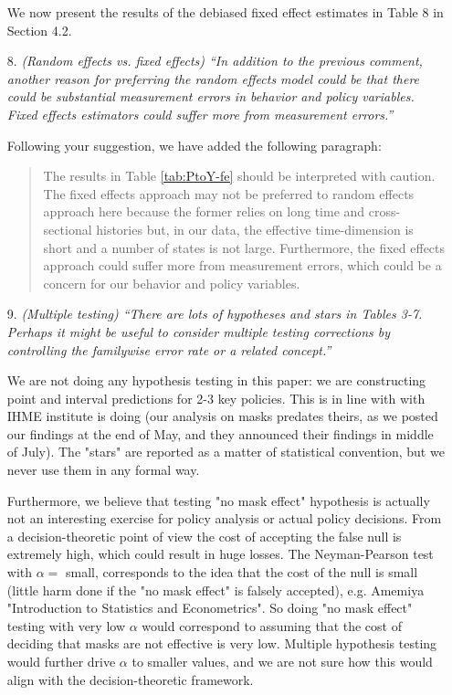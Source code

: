 \documentclass[11pt]{article}
\begin{document}
\begin{itemize}
We now present the results of the debiased fixed effect estimates in Table 8 in Section 4.2. 
  
\item[8.]  \textit{(Random effects vs. fixed effects) ``In addition to the previous comment, another reason for
preferring the random effects model could be that there could be substantial measurement
errors in behavior and policy variables. Fixed effects estimators could suffer more from measurement
errors.''}

Following your suggestion, we have added the following paragraph:
\begin{quote}
The results in Table \ref{tab:PtoY-fe} should be interpreted with caution. The fixed effects approach may not be preferred to random effects approach here because the former relies on long time and cross-sectional histories but, in our data, the effective time-dimension is short and a number of states is not large. Furthermore, the fixed effects approach could suffer more from  measurement errors, which could be a concern for our behavior and policy variables.
\end{quote}
  
\item[9.]  \textit{(Multiple testing) ``There are lots of hypotheses and stars in Tables 3-7. Perhaps it might be
useful to consider multiple testing corrections by controlling the familywise error rate or a
related concept.''}

We are not doing any hypothesis testing in this paper: we are constructing point and interval predictions for 2-3 key policies. This
is in line with with IHME institute is doing (our analysis on masks predates theirs, as we posted our findings
at the end of May, and they announced their findings in middle of July). The 
"stars" are reported as a matter of statistical convention, but we never use them in any formal way.

Furthermore, we believe that testing "no mask effect" hypothesis is actually not an interesting exercise for policy analysis
or actual policy decisions.   From a decision-theoretic point of view the cost of accepting the false null is extremely high,
which could result in huge losses. The Neyman-Pearson test with $\alpha=$ small, corresponds to the idea that the cost
of the null is small (little harm done if the "no mask effect" is falsely accepted), e.g. Amemiya "Introduction to Statistics and Econometrics".  So doing "no mask effect" testing with very low $\alpha$ would correspond to assuming that the cost of deciding that masks are not effective is very low.  Multiple hypothesis testing would further drive $\alpha$ to smaller values, and we are not sure how this would align with the decision-theoretic framework.


\end{itemize}
\end{document}
